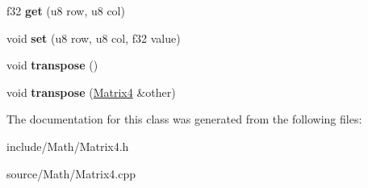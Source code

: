 \begin{DoxyCompactItemize}
\item 
f32 {\bfseries get} (u8 row, u8 col)\hypertarget{classDE_1_1Matrix4_afc968e2fbe42762912618f766dc95518}{}\label{classDE_1_1Matrix4_afc968e2fbe42762912618f766dc95518}

\item 
void {\bfseries set} (u8 row, u8 col, f32 value)\hypertarget{classDE_1_1Matrix4_a38b0de6a91acebf6015cca263f34c036}{}\label{classDE_1_1Matrix4_a38b0de6a91acebf6015cca263f34c036}

\item 
void {\bfseries transpose} ()\hypertarget{classDE_1_1Matrix4_a6011b92a1c43331cdea2be7e2b51c45d}{}\label{classDE_1_1Matrix4_a6011b92a1c43331cdea2be7e2b51c45d}

\item 
void {\bfseries transpose} (\hyperlink{classDE_1_1Matrix4}{Matrix4} \&other)\hypertarget{classDE_1_1Matrix4_a4e1a75e4675a3dfd4bfab5d074321b7f}{}\label{classDE_1_1Matrix4_a4e1a75e4675a3dfd4bfab5d074321b7f}

\end{DoxyCompactItemize}


The documentation for this class was generated from the following files\+:\begin{DoxyCompactItemize}
\item 
include/\+Math/Matrix4.\+h\item 
source/\+Math/Matrix4.\+cpp\end{DoxyCompactItemize}
